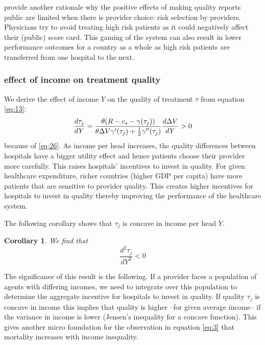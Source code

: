 \documentclass[a4paper,12pt]{article}
\newtheorem{corollary}{Corollary}
\begin{document}
\cite{dranoveReportCards2003} provide another rationale why the positive effects of making quality reports public are limited when there is provider choice: risk selection by providers. Physicians try to avoid treating high risk patients as it could negatively affect their (public) score card. This gaming of the system can also result in lower performance outcomes for a country as a whole as high risk patients are transferred from one hospital to the next.

\subsubsection{effect of income on treatment quality}
\label{sec:orgcb6b990}

We derive the effect of income \(Y\) on the quality of treatment \(\tau\) from equation \eqref{eq:13}: 
\begin{equation}
\label{eq:29}
\frac{d\tau_j}{dY} = \frac{\theta (R-c_s-\gamma(\tau_j))}{\theta \Delta V \gamma'(\tau_j) + \textstyle{1\over 2} \gamma''(\tau_j) } \frac{d\Delta V}{dY} > 0
\end{equation}
because of \eqref{eq:26}. As income per head increases, the quality differences between hospitals have a bigger utility effect and hence patients choose their provider more carefully. This raises hospitals' incentives to invest in quality. For given healthcare expenditure, richer countries (higher GDP per capita) have more patients that are sensitive to provider quality. This creates higher incentives for hospitals to invest in quality thereby improving the performance of the healthcare system.

The following corollary shows that \(\tau_j\) is concave in income per head \(Y\).

\begin{corollary}
\label{cor:tauY}
We find that
\begin{equation}
\label{eq:23}
\frac{d^2 \tau_j}{dY^2} < 0
\end{equation}
\end{corollary}

The significance of this result is the following. If a provider faces a population of agents with differing incomes, we need to integrate over this population to determine the aggregate incentive for hospitals to invest in quality. If quality \(\tau_j\) is concave in income this implies that quality is higher --for given average income-- if the variance in income is lower (Jensen's inequality for a concave function). This gives another micro foundation for the observation in equation \eqref{eq:3} that mortality increases with income inequality.
\end{document}
